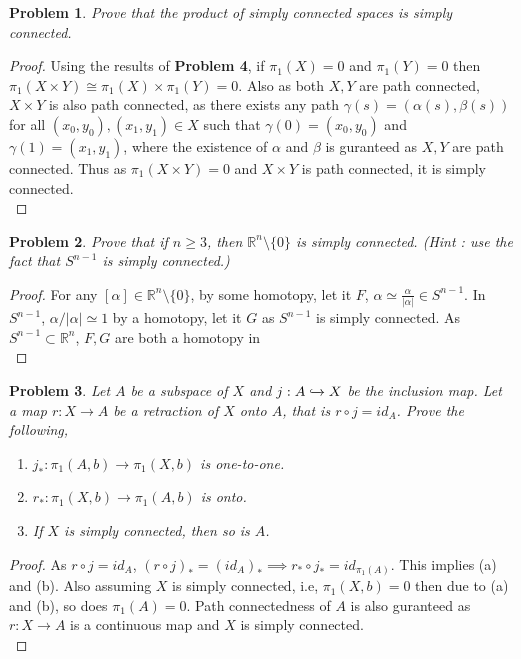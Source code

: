 \documentclass[paper=a4, fontsize=11pt]{scrartcl}
\newtheorem{problem}{Problem}
\begin{document}
\begin{problem}
	Prove that the product of simply connected spaces is simply connected.\\
\end{problem}



\begin{proof}
	Using the results of \textbf{Problem 4}, if $\pi_1(X) = 0$ and $\pi_1(Y) = 0$ then $\pi_1(X \times Y) \cong \pi_1(X) \times \pi_1(Y) = 0$. Also as both $X,Y$ are path connected, $X\times Y$ is also path connected, as there exists any path $\gamma(s)=(\alpha(s),\beta(s))$ for all $(x_0,y_0),(x_1,y_1)\in X$ such that $\gamma(0)=(x_0,y_0)$ and $\gamma(1)=(x_1,y_1)$, where the existence of $\alpha$ and $\beta$ is guranteed as $X,Y$ are path connected. Thus as $\pi_1(X\times Y) = 0$ and $X \times Y$ is path connected, it is simply connected.\\
\end{proof}

\begin{problem}
	Prove that if $n \geq 3$, then $\mathbb{R}^n \setminus \{0\}$ is simply connected. (Hint : use the fact that $S^{n-1}$ is simply connected.)\\
\end{problem}

\begin{proof}
	For any $[\alpha] \in \mathbb{R}^n \setminus \{0\}$, by some homotopy, let it $F$, $\alpha \simeq \frac{\alpha}{|\alpha|}\in S^{n-1}$. In $S^{n-1}$, $ \alpha/|\alpha| \simeq 1$ by a homotopy, let it $G$ as $S^{n-1}$ is simply connected. As $S^{n-1} \subset \mathbb{R}^n$, $F,G$ are both a homotopy in  \\
\end{proof}

\begin{problem}
	Let $A$ be a subspace of $X$ and $j:A\xhookrightarrow{}X$ be the inclusion map. Let a map $r:X\to A$ be a retraction of $X$ onto  $A$, that is $r \circ j = id_A$. Prove the following,\\
	\begin{enumerate}[label=(\alph*)]
		\item $j_*:\pi_1(A,b)\to \pi_1(X,b)$ is one-to-one.		
		\item $r_*:\pi_1(X,b)\to \pi_1(A,b)$ is onto.
		\item If $X$ is simply connected, then so is $A$.\\
	\end{enumerate}
\end{problem}

\begin{proof}
	As $r \circ j = id_A$, $(r \circ j)_* = (id_A)_* \implies r_* \circ j_* = id_{\pi_1(A)}$. This implies (a) and (b). Also assuming $X$ is simply connected, i.e, $\pi_1(X,b) = 0$ then due to (a) and (b), so does $\pi_1(A) = 0$. Path connectedness of $A$ is also guranteed as $r:X\to A$ is a continuous map and $X$ is simply connected.\\
\end{proof}
\end{document}
